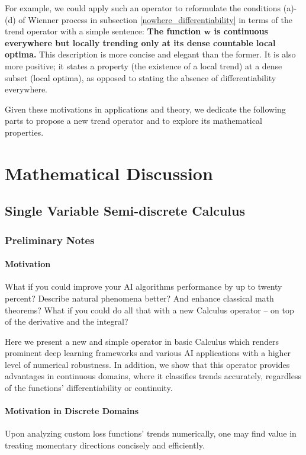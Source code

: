 \documentclass[11pt]{book}
\begin{document}
For example, we could apply such an operator to reformulate the conditions
(a)-(d) of Wienner process in subsection \ref{nowhere_differentiability}
in terms of the trend operator with a simple sentence: \textbf{The
function \ensuremath{\boldsymbol{w}} is continuous everywhere but
locally trending only at its dense countable local optima.} This description
is more concise and elegant than the former. It is also more positive;
it states a property (the existence of a local trend) at a dense subset
(local optima), as opposed to stating the absence of differentiability
everywhere.

Given these motivations in applications and theory, we dedicate the
following parts to propose a new trend operator and to explore its mathematical
properties.

\newpage{}

\part{Mathematical Discussion}
\label{mathematical_discussion_part}

\chapter{Single Variable Semi-discrete Calculus}
\section{Preliminary Notes}

\subsection{Motivation}
What if you could improve your AI algorithms performance by up to twenty percent? Describe natural phenomena better? And enhance classical math theorems? What if you could do all that with a new Calculus operator – on top of the derivative and the integral?

Here we present a new and simple operator in basic Calculus which renders prominent deep learning frameworks and various AI applications with a higher level of numerical robustness. In addition, we show that this operator provides advantages in continuous domains, where it classifies trends accurately, regardless of the functions’ differentiability or continuity.

\subsection{Motivation in Discrete Domains}
Upon analyzing custom loss functions' trends numerically, one may find value in treating momentary directions concisely and efficiently.
\end{document}
